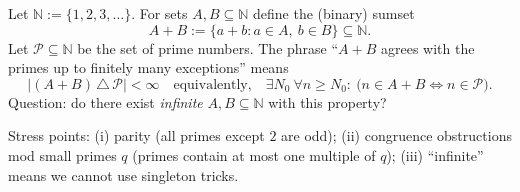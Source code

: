 Let $\mathbb N:=\{1,2,3,\dots\}$. For sets $A,B\subseteq\mathbb N$ define the (binary) sumset
\[
A+B := \{a+b : a\in A,\ b\in B\}\subseteq \mathbb N.
\]
Let $\mathcal P\subseteq\mathbb N$ be the set of prime numbers. The phrase ``$A+B$ agrees with the primes up to finitely many exceptions'' means
\[
\lvert (A+B)\,\triangle\,\mathcal P\rvert <\infty
\quad\text{equivalently,}\quad
\exists N_0\ \forall n\ge N_0:\ \bigl(n\in A+B \iff n\in\mathcal P\bigr).
\]
Question: do there exist \emph{infinite} $A,B\subseteq\mathbb N$ with this property?

Stress points:
(i) parity (all primes except $2$ are odd);
(ii) congruence obstructions mod small primes $q$ (primes contain at most one multiple of $q$);
(iii) ``infinite'' means we cannot use singleton tricks.
